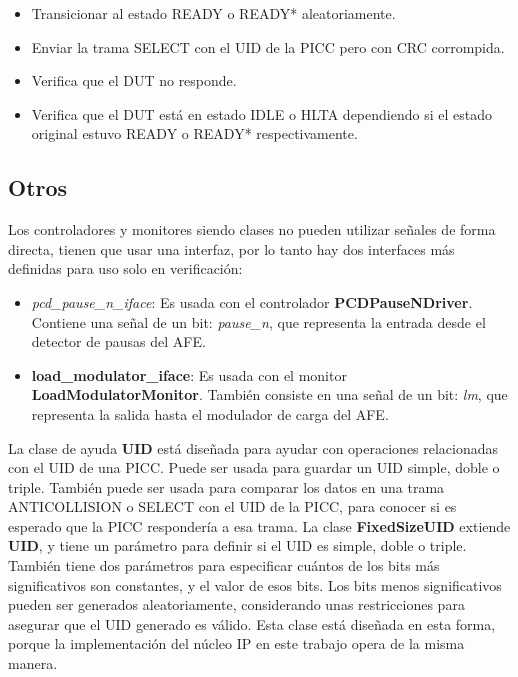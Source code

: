 \documentclass[a4paper, twoside, 11pt]{report}
\begin{document}
\begin{itemize}
  \item Transicionar al estado READY o READY* aleatoriamente.
  \item Enviar la trama SELECT con el UID de la PICC pero con CRC corrompida.
  \item Verifica que el DUT no responde.
  \item Verifica que el DUT está en estado IDLE o HLTA dependiendo si el estado original estuvo READY o READY* respectivamente.
\end{itemize}

\FloatBarrier
\subsection{Otros}

Los controladores y monitores siendo clases no pueden utilizar señales de forma directa, tienen que usar una interfaz, por lo tanto hay dos interfaces más definidas para uso solo en verificación:

\begin{itemize}
  \item \textit{pcd\_pause\_n\_iface}: Es usada con el controlador \textbf{PCDPauseNDriver}. Contiene una señal de un bit: \textit{pause\_n}, que representa la entrada desde el detector de pausas del AFE.
  \item \textbf{load\_modulator\_iface}: Es usada con el monitor \textbf{LoadModulatorMonitor}. También consiste en una señal de un bit: \textit{lm}, que representa la salida hasta el modulador de carga del AFE.
\end{itemize}

La clase de ayuda \textbf{UID} está diseñada para ayudar con operaciones relacionadas con el UID de una PICC. Puede ser usada para guardar un UID simple, doble o triple. También puede ser usada para comparar los datos en una trama ANTICOLLISION o SELECT con el UID de la PICC, para conocer si es esperado que la PICC respondería a esa trama. La clase \textbf{FixedSizeUID} extiende \textbf{UID}, y tiene un parámetro para definir si el UID es simple, doble o triple. También tiene dos parámetros para especificar cuántos de los bits más significativos son constantes, y el valor de esos bits. Los bits menos significativos pueden ser generados aleatoriamente, considerando unas restricciones para asegurar que el UID generado es válido. Esta clase está diseñada en esta forma, porque la implementación del núcleo IP en este trabajo opera de la misma manera.
\end{document}
